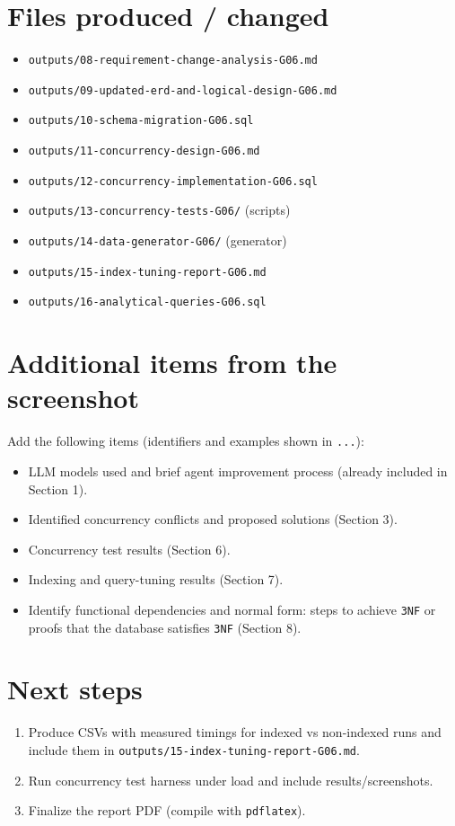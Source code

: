 \documentclass[12pt,a4paper]{article}
\begin{document}
\section{Files produced / changed}
\begin{itemize}[nosep]
  \item \texttt{outputs/08-requirement-change-analysis-G06.md}
  \item \texttt{outputs/09-updated-erd-and-logical-design-G06.md}
  \item \texttt{outputs/10-schema-migration-G06.sql}
  \item \texttt{outputs/11-concurrency-design-G06.md}
  \item \texttt{outputs/12-concurrency-implementation-G06.sql}
  \item \texttt{outputs/13-concurrency-tests-G06/} (scripts)
  \item \texttt{outputs/14-data-generator-G06/} (generator)
  \item \texttt{outputs/15-index-tuning-report-G06.md}
  \item \texttt{outputs/16-analytical-queries-G06.sql}
\end{itemize}

\section{Additional items from the screenshot}
Add the following items (identifiers and examples shown in \texttt{...}):
\begin{itemize}[nosep]
  \item LLM models used and brief agent improvement process (already included in Section 1).
  \item Identified concurrency conflicts and proposed solutions (Section 3).
  \item Concurrency test results (Section 6).
  \item Indexing and query-tuning results (Section 7).
  \item Identify functional dependencies and normal form: steps to achieve \texttt{3NF} or proofs that the database satisfies \texttt{3NF} (Section 8).
\end{itemize}

\section{Next steps}
\begin{enumerate}[nosep]
  \item Produce CSVs with measured timings for indexed vs non-indexed runs and include them in \texttt{outputs/15-index-tuning-report-G06.md}.
  \item Run concurrency test harness under load and include results/screenshots.
  \item Finalize the report PDF (compile with \texttt{pdflatex}).
\end{enumerate}
\end{document}

